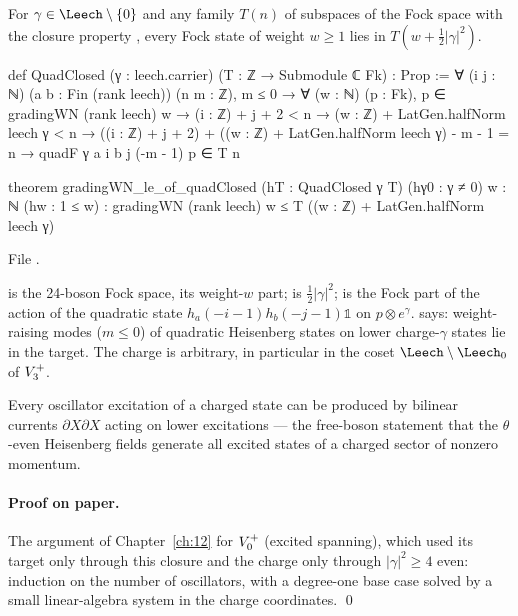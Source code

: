 \begin{theorem}\label{ch14:thm:excited}
For $\gamma\in\Leech\setminus\{0\}$ and any family $T(n)$ of subspaces of the Fock space with the closure
property , every Fock state of weight $w\ge1$ lies in $T(w+\tfrac12|\gamma|^2)$.
\end{theorem}
\begin{leancode}
def QuadClosed (γ : leech.carrier) (T : ℤ → Submodule ℂ Fk) : Prop :=
  ∀ (i j : ℕ) (a b : Fin (rank leech)) (n m : ℤ), m ≤ 0 → ∀ (w : ℕ) (p : Fk),
    p ∈ gradingWN (rank leech) w → (i : ℤ) + j + 2 < n → (w : ℤ) + LatGen.halfNorm leech γ < n →
    ((i : ℤ) + j + 2) + ((w : ℤ) + LatGen.halfNorm leech γ) - m - 1 = n →
    quadF γ a i b j (-m - 1) p ∈ T n

theorem gradingWN_le_of_quadClosed (hT : QuadClosed γ T) (hγ0 : γ ≠ 0) {w : ℕ} (hw : 1 ≤ w) :
    gradingWN (rank leech) w ≤ T ((w : ℤ) + LatGen.halfNorm leech γ)
\end{leancode}
File .

\begin{dictionary}
 is the 24-boson Fock space,  its weight-$w$ part;  is
$\tfrac12|\gamma|^2$;  is the Fock part of the action of the quadratic state
$h_a(-i-1)h_b(-j-1)\mathbb 1$ on $p\otimes e^\gamma$.   says: weight-raising modes ($m\le0$) of
quadratic Heisenberg states on lower charge-$\gamma$ states lie in the target.  The charge is arbitrary,
in particular in the coset $\Leech\setminus\Leech_0$ of $V_3^{+}$.
\end{dictionary}

\begin{physics}
Every oscillator excitation of a charged state can be produced by bilinear currents $\partial X\partial X$
acting on lower excitations — the free-boson statement that the $\theta$-even Heisenberg fields generate
all excited states of a charged sector of nonzero momentum.
\end{physics}

\paragraph{Proof on paper.}  The argument of Chapter~\ref{ch:12} for $V_0^{+}$ (excited spanning), which used
its target only through this closure and the charge only through $|\gamma|^2\ge4$ even: induction on the
number of oscillators, with a degree-one base case solved by a small linear-algebra system in the
charge coordinates. \qed

